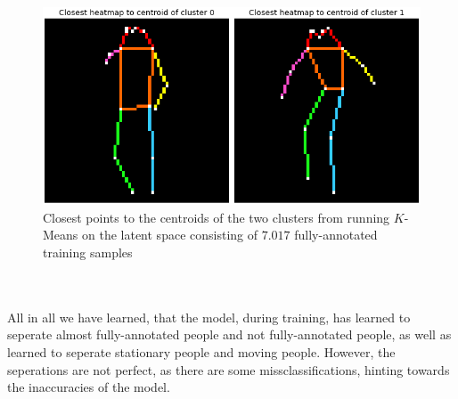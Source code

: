 \documentclass[./main.tex]{subfiles}
\begin{document}
\begin{figure}[b]
    \centering
    \includegraphics[height = 4 cm]{entities/centroids_full_skeletons.png}
    \caption{Closest points to the centroids of the two clusters from running $K$-Means on the latent space consisting of $7.017$ fully-annotated training samples}
    \label{fig:centroids_full}
\end{figure}
\\
\\
All in all we have learned, that the model, during training, has learned to seperate almost fully-annotated people and not fully-annotated people, as well as learned to seperate stationary people and moving people. However, the seperations are not perfect, as there are some missclassifications, hinting towards the inaccuracies of the model.
\end{document}
